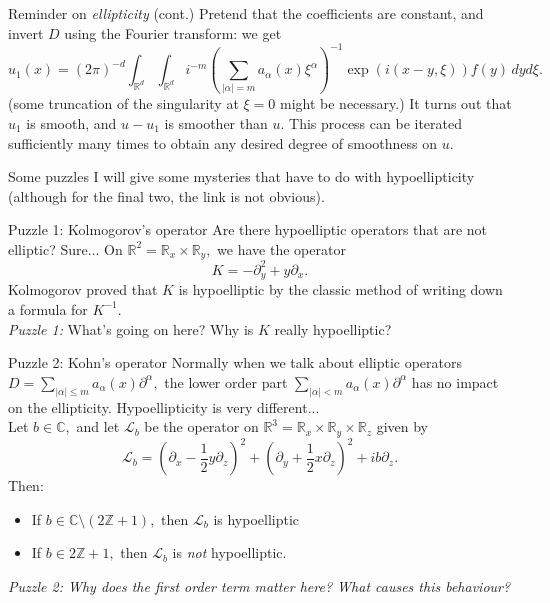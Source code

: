 \documentclass{beamer}
\numberwithin{equation}{section}
\theoremstyle{plain}
\theoremstyle{plain}
\theoremstyle{definition}
\theoremstyle{plain}
\theoremstyle{plain}
\theoremstyle{definition}
\newcommand{\Rl}{\mathbb{R}}
\newcommand{\Cplx}{\mathbb{C}}
\newcommand{\Itgr}{\mathbb{Z}}
\newcommand{\Lc}{\mathcal{L}}
\begin{document}
\begin{frame}{Reminder on \emph{ellipticity} (cont.)}
    Pretend that the coefficients are constant, and invert $D$ using the Fourier transform: we get
    \[
        u_1(x) = (2\pi)^{-d}\int_{\Rl^d}\int_{\Rl^d} i^{-m}(\sum_{|\alpha|=m} a_{\alpha}(x)\xi^{\alpha})^{-1}\exp(i(x-y,\xi))f(y)\,dyd\xi.
    \]
    (some truncation of the singularity at $\xi=0$ might be necessary.) It turns out that $u_1$ is smooth, and $u-u_1$ is smoother than $u.$ This process can be iterated sufficiently many times to obtain any desired degree of smoothness on $u.$
\end{frame}

\begin{frame}{Some puzzles}
    I will give some mysteries that have to do with hypoellipticity (although for the final two, the link is not obvious).
\end{frame}

\begin{frame}{Puzzle 1: Kolmogorov's operator}
Are there hypoelliptic operators that are not elliptic? Sure... On $\Rl^2 = \Rl_x\times \Rl_y,$ we have the operator
\[
    K = -\partial^2_y+y\partial_x.
\]
Kolmogorov proved that $K$ is hypoelliptic by the classic method of writing down a formula for $K^{-1}.$\\
\emph{Puzzle 1:} What's going on here? Why is $K$ really hypoelliptic?
\end{frame}

\begin{frame}{Puzzle 2: Kohn's operator}
Normally when we talk about elliptic operators $D = \sum_{|\alpha|\leq m}a_{\alpha}(x)\partial^{\alpha},$ the lower order part $\sum_{|\alpha|<m} a_{\alpha}(x)\partial^{\alpha}$ has no impact on the ellipticity. Hypoellipticity is very different...\\\pause
Let $b\in \Cplx,$ and let $\Lc_b$ be the operator on $\Rl^3=\Rl_x\times \Rl_y\times \Rl_z$ given by
\[
    \Lc_b = (\partial_x-\frac12y\partial_z)^2+(\partial_y+\frac12x\partial_z)^2+ib\partial_z.
\]
Then:
\begin{itemize}
    \item{} If $b \in \Cplx\setminus (2\Itgr+1),$ then $\Lc_b$ is hypoelliptic
    \item{} If $b \in 2\Itgr+1,$ then $\Lc_b$ is \emph{not} hypoelliptic.
\end{itemize}
\pause
\emph{Puzzle 2: Why does the first order term matter here? What causes this behaviour?}
\end{frame}
\end{document}
